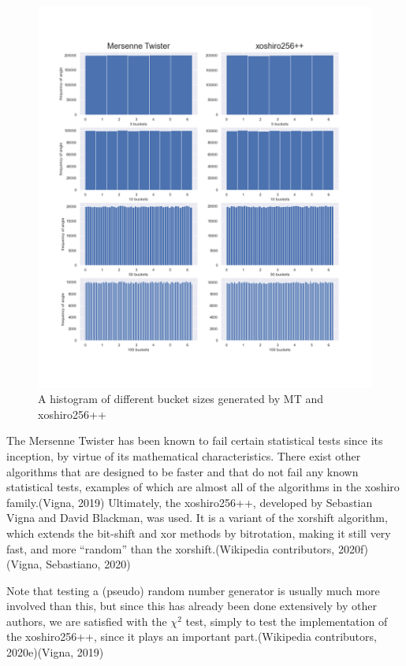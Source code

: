 \documentclass[
]{article}
\begin{document}
\begin{figure}
\centering
\includegraphics{Assets/angle_buckets.png}
\caption{A histogram of different bucket sizes generated by MT and
xoshiro256++}
\end{figure}

The Mersenne Twister has been known to fail certain statistical tests
since its inception, by virtue of its mathematical characteristics.
There exist other algorithms that are designed to be faster and that do
not fail any known statistical tests, examples of which are almost all
of the algorithms in the xoshiro family.(Vigna, 2019) Ultimately, the
xoshiro256++, developed by Sebastian Vigna and David Blackman, was used.
It is a variant of the xorshift algorithm, which extends the bit-shift
and xor methods by bitrotation, making it still very fast, and more
``random'' than the xorshift.(Wikipedia contributors, 2020f)(Vigna,
Sebastiano, 2020)

Note that testing a (pseudo) random number generator is usually much
more involved than this, but since this has already been done
extensively by other authors, we are satisfied with the \(\chi^2\) test,
simply to test the implementation of the xoshiro256++, since it plays an
important part.(Wikipedia contributors, 2020e)(Vigna, 2019)
\end{document}
